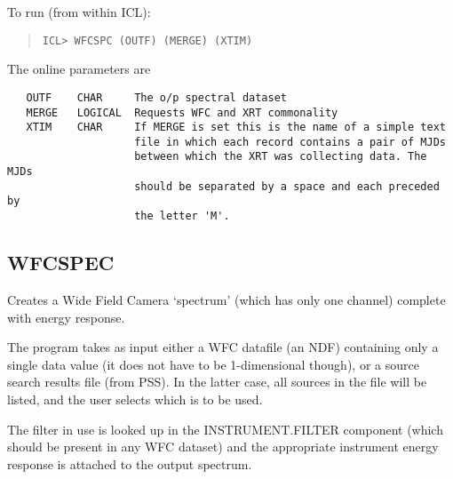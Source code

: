 \documentclass{book}
\renewcommand{\_}{{\tt\char'137}}     %
\begin{document}
To run (from within ICL):
\begin{quote}\begin{verbatim}
ICL> WFCSPC (OUTF) (MERGE) (XTIM)
\end{verbatim}\end{quote}
The online parameters are
\begin{verbatim}
   OUTF    CHAR     The o/p spectral dataset
   MERGE   LOGICAL  Requests WFC and XRT commonality
   XTIM    CHAR     If MERGE is set this is the name of a simple text
                    file in which each record contains a pair of MJDs
                    between which the XRT was collecting data. The MJDs
                    should be separated by a space and each preceded by
                    the letter 'M'.
\end{verbatim}
\subsection{WFCSPEC}
Creates a Wide Field Camera `spectrum' (which has only one
channel) complete with energy response.
 
The program takes as input either a WFC datafile (an NDF)
containing only a single data value (it does not have to
be 1-dimensional though), or a source search
results file (from PSS). In the latter case, all sources
in the file will be listed, and the user selects which
is to be used.
 
The filter in use is looked up in the INSTRUMENT.FILTER
component (which should be present in any WFC dataset)
and the appropriate instrument energy response is attached
to the output spectrum.
 
\end{document}
